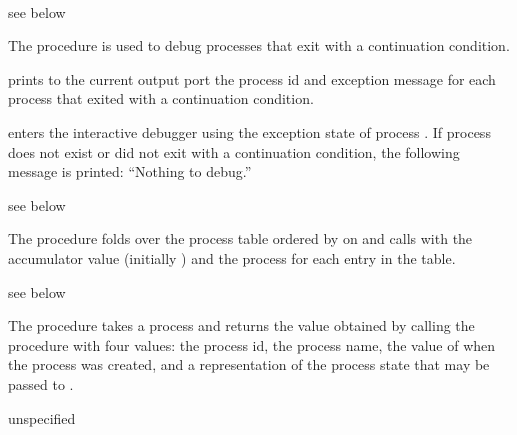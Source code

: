 \begin{procedure}
  \\
\end{procedure}
\returns{} see below

The  procedure is used to debug processes that exit with a
continuation condition.

 prints to the current output port the process id and
exception message for each process that exited with a continuation
condition.

 enters the interactive debugger using the
exception state of process . If process  does not
exist or did not exit with a continuation condition, the following
message is printed: ``Nothing to debug.''

\begin{procedure}
\end{procedure}
\returns{} see below

The  procedure folds over the process table
ordered by  on  and calls 
with the accumulator value (initially ) and the process
for each entry in the table.

\begin{procedure}
\end{procedure}
\returns{} see below

The  procedure takes a process 
and returns the value obtained by calling the procedure 
with four values:
the process id,
the process name,
the value of  when the process was created,
and a representation of the process state
that may be passed to .

\begin{procedure}
\end{procedure}
\returns{} unspecified

